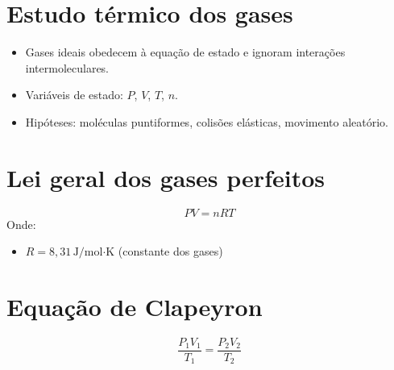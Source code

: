 \documentclass[a4paper,12pt]{article}
\begin{document}
\begin{multicols}{2}
\section{Estudo térmico dos gases}
\begin{itemize}
    \item Gases ideais obedecem à equação de estado e ignoram interações intermoleculares.
    \item Variáveis de estado: $P$, $V$, $T$, $n$.
    \item Hipóteses: moléculas puntiformes, colisões elásticas, movimento aleatório.
\end{itemize}

\section{Lei geral dos gases perfeitos}
\begin{equation*}
    PV = nRT
\end{equation*}
Onde:
\begin{itemize}
    \item $R = 8{,}31 \, \text{J/mol·K}$ (constante dos gases)
\end{itemize}

\section{Equação de Clapeyron}
\begin{equation*}
    \frac{P_1V_1}{T_1} = \frac{P_2V_2}{T_2}
\end{equation*}


\end{multicols}
\end{document}
